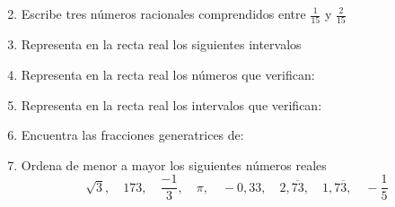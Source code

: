 \documentclass[10pt,twoside]{article}
\begin{document}
\begin{enumerate}
\begin{enumerate}
\begin{multicols}{2}
\end{multicols}
\end{enumerate}
  \item Escribe tres números racionales comprendidos entre $ \frac{1}{15} $ y $ \frac{2}{15} $
  \item Representa en la recta real los siguientes intervalos
  \begin{enumerate}
  \end{enumerate}
  \item Representa en la recta real los números que verifican:
  \begin{enumerate}
  \end{enumerate}
  \item Representa en la recta real los intervalos que verifican:
  \begin{enumerate}
  \end{enumerate}
  \item Encuentra las fracciones generatrices de:
  \begin{enumerate}
  \end{enumerate}
  \item Ordena de menor a mayor los siguientes números reales
  \[ \sqrt{3},\quad 173,\quad \frac{-1}{3},\quad \pi, \quad -0,33, \quad 2,\overline{73}, \quad 1,7\overline{3}, \quad -\frac{1}{5} \]
  \end{enumerate}
\end{document}
